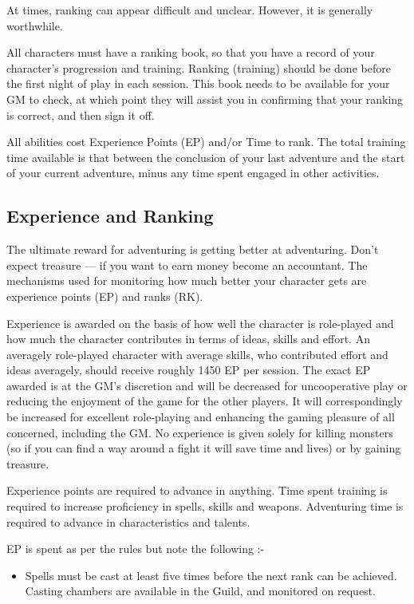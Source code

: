 \documentclass[twoside,a4paper]{article}
\begin{document}
\begin{multicols}{2}
At times, ranking can appear difficult and unclear.  However, it is
generally worthwhile.

All characters must have a ranking book, so that you have a record of
your character's progression and training. Ranking (training) should
be done before the first night of play in each session. This book
needs to be available for your GM to check, at which point they will
assist you in confirming that your ranking is correct, and then sign
it off.

All abilities cost Experience Points (EP) and/or Time to rank. The
total training time available is that between the conclusion of your
last adventure and the start of your current adventure, minus any time
spent engaged in other activities.

\subsection{Experience and Ranking}

The ultimate reward for adventuring is getting better at adventuring.
Don't expect treasure --- if you want to earn money become an
accountant.  The mechanisms used for monitoring how much better your
character gets are experience points (EP) and ranks (RK).

Experience is awarded on the basis of how well the character is
role-played and how much the character contributes in terms of ideas,
skills and effort.  An averagely role-played character with average
skills, who contributed effort and ideas averagely, should receive
roughly 1450 EP per session.  The exact EP awarded is at the GM's
discretion and will be decreased for uncooperative play or reducing
the enjoyment of the game for the other players.  It will
correspondingly be increased for excellent role-playing and enhancing
the gaming pleasure of all concerned, including the GM.  No experience
is given solely for killing monsters (so if you can find a way around
a fight it will save time and lives) or by gaining treasure.

Experience points are required to advance in anything.  Time spent
training is required to increase proficiency in spells, skills and
weapons.  Adventuring time is required to advance in characteristics
and talents.

EP is spent as per the rules but note the following :-
\begin{itemize}

\item
Spells must be cast at least five times before the next rank can be
achieved.  Casting chambers are available in the Guild, and monitored
on request.


\end{itemize}
\end{multicols}
\end{document}
